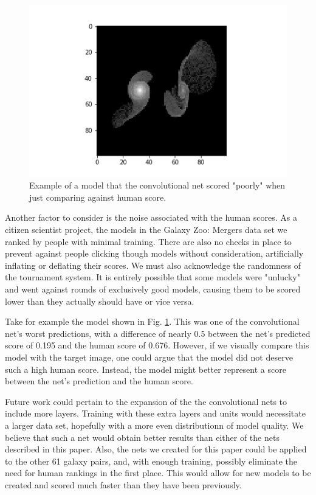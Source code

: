 \documentclass[conference]{IEEEtran}
\begin{document}
\begin{figure}[htbp]
\centerline{\includegraphics[width=0.75\linewidth]{./Images/ConvHumanNoiseExample.png}}
\caption{Example of a model that the convolutional net scored "poorly" when just comparing against human score.}
\label{fig:ConvHumanNoiseExample}
\end{figure}

Another factor to consider is the noise associated with the human scores. As a citizen scientist project, the models in the Galaxy Zoo: Mergers data set we ranked by people with minimal training. There are also no checks in place to prevent against people clicking though models without consideration, artificially inflating or deflating their scores. We must also acknowledge the randomness of the tournament system. It is entirely possible that some models were "unlucky" and went against rounds of exclusively good models, causing them to be scored lower than they actually should have or vice versa.

Take for example the model shown in Fig. \ref{fig:ConvHumanNoiseExample}. This was one of the convolutional net's worst predictions, with a difference of nearly 0.5 between the net's predicted score of 0.195 and the human score of 0.676. However, if we visually compare this model with the target image, one could argue that the model did not deserve such a high human score. Instead, the model might better represent a score between the net's prediction and the human score. 

Future work could pertain to the expansion of the the convolutional nets to include more layers. Training with these extra layers and units would necessitate a larger data set, hopefully with a more even distributionn of model quality. We believe that such a net would obtain better results than either of the nets described in this paper.  Also, the nets we created for this paper could be applied to the other 61 galaxy pairs, and, with enough training, possibly eliminate the need for human rankings in the first place. This would allow for new models to be created and scored much faster than they have been previously. 



\end{document}
